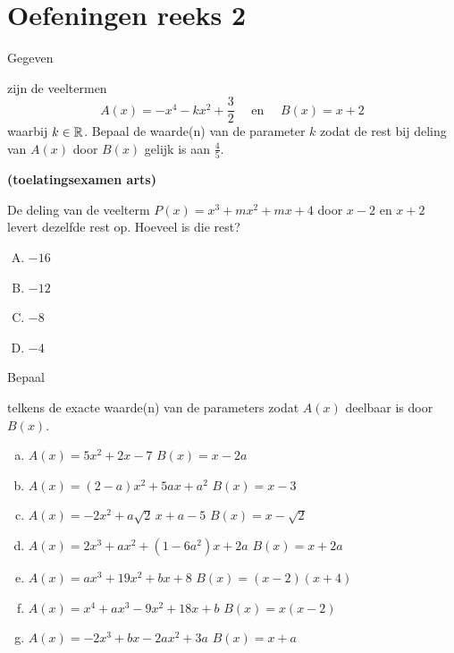 \documentclass{ximera}
\begin{document}
\section*{Oefeningen reeks 2}

\begin{exercise} 
\hypertarget{oef3.5}{Gegeven} zijn de veeltermen
\[
A(x) = -x^4 - kx^2+\frac{3}{2} \quad \text{ en } \quad B(x) = x+2
\]
waarbij $k \in \mathbb{R}$. Bepaal de waarde(n) van de parameter $k$ zodat de rest bij deling van $A(x)$ door $B(x)$ gelijk is aan $\frac{4}{5}$. 
\end{exercise} 

\begin{exercise} 
\hypertarget{oef3.6}{{\bf (toelatingsexamen arts)}} 
De deling van de veelterm $P(x) = x^3 + mx^2 + mx + 4$ door $x-2$ en $x+2$ levert dezelfde rest op. Hoeveel is die rest?
\begin{multicols}{4} 
\begin{enumerate}[(A)]
\item 
$-16$
\item 
$-12$ 
\item 
$-8$ 
\item
$-4$
\end{enumerate}
\end{multicols}
\end{exercise} 

\begin{exercise} 
\hypertarget{oef3.7}{Bepaal} telkens de exacte waarde(n) van de parameters zodat $A(x)$ deelbaar is door $B(x)$. 
\begin{enumerate}[(a)]
\item
$A(x) = 5x^2+2x-7$ \quad {} \quad $B(x) = x-2a$ 
\item
$A(x) = (2-a)x^2 + 5ax + a^2$ \quad {} \quad $B(x) = x-3$ 
\item
$A(x) = -2x^2 + a\sqrt{2}\,x + a-5$ \quad {} \quad $B(x) = x-\sqrt{2}$ 
\item
$A(x) = 2x^3 + ax^2 + (1-6a^2)x + 2a$ \quad {} \quad $B(x) = x+2a$ 
\item
$A(x) = ax^3 + 19x^2 + bx + 8$ \quad {} \quad $B(x) = (x-2)(x+4)$ 
\item
$A(x) = x^4 + ax^3 - 9x^2 + 18x + b$ \quad {} \quad $B(x) = x(x-2)$ 
\item 
$A(x) = -2x^3 + bx - 2ax^2 + 3a$ \quad {} \quad $B(x) = x+a$ 
\end{enumerate}
\end{exercise} 
\end{document}
